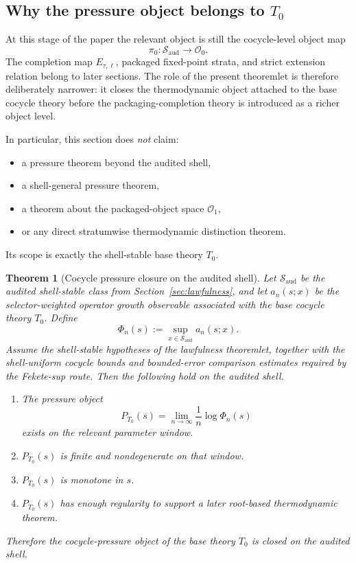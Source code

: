 \documentclass[11pt]{article}
\newtheorem{theorem}{Theorem}[section]
\theoremstyle{definition}
\newcommand{\Tzero}{T_0}
\begin{document}
\subsection{Why the pressure object belongs to \texorpdfstring{$\Tzero$}{T0}}

At this stage of the paper the relevant object is still the cocycle-level object map
\[
\pi_0:\mathcal{S}_{\mathrm{aud}}\to \mathcal{O}_0.
\]
The completion map \(E_{\tau,\ell}\), packaged fixed-point strata, and strict extension relation belong to later sections. The role of the present theoremlet is therefore deliberately narrower: it closes the thermodynamic object attached to the base cocycle theory before the packaging-completion theory is introduced as a richer object level.

In particular, this section does \emph{not} claim:
\begin{itemize}
    \item a pressure theorem beyond the audited shell,
    \item a shell-general pressure theorem,
    \item a theorem about the packaged-object space \(\mathcal{O}_1\),
    \item or any direct stratumwise thermodynamic distinction theorem.
\end{itemize}
Its scope is exactly the shell-stable base theory \(\Tzero\).

\begin{theorem}[Cocycle pressure closure on the audited shell]\label{thm:cocycle-pressure}
Let \(\mathcal{S}_{\mathrm{aud}}\) be the audited shell-stable class from Section~\ref{sec:lawfulness}, and let \(a_n(s;x)\) be the selector-weighted operator growth observable associated with the base cocycle theory \(\Tzero\). Define
\[
\Phi_n(s):=\sup_{x\in\mathcal{S}_{\mathrm{aud}}} a_n(s;x).
\]
Assume the shell-stable hypotheses of the lawfulness theoremlet, together with the shell-uniform cocycle bounds and bounded-error comparison estimates required by the Fekete-sup route. Then the following hold on the audited shell.

\begin{enumerate}
    \item The pressure object
    \[
    P_{\Tzero}(s)=\lim_{n\to\infty}\frac{1}{n}\log \Phi_n(s)
    \]
    exists on the relevant parameter window.
    \item \(P_{\Tzero}(s)\) is finite and nondegenerate on that window.
    \item \(P_{\Tzero}(s)\) is monotone in \(s\).
    \item \(P_{\Tzero}(s)\) has enough regularity to support a later root-based thermodynamic theorem.
\end{enumerate}

Therefore the cocycle-pressure object of the base theory \(\Tzero\) is closed on the audited shell.
\end{theorem}
\end{document}
